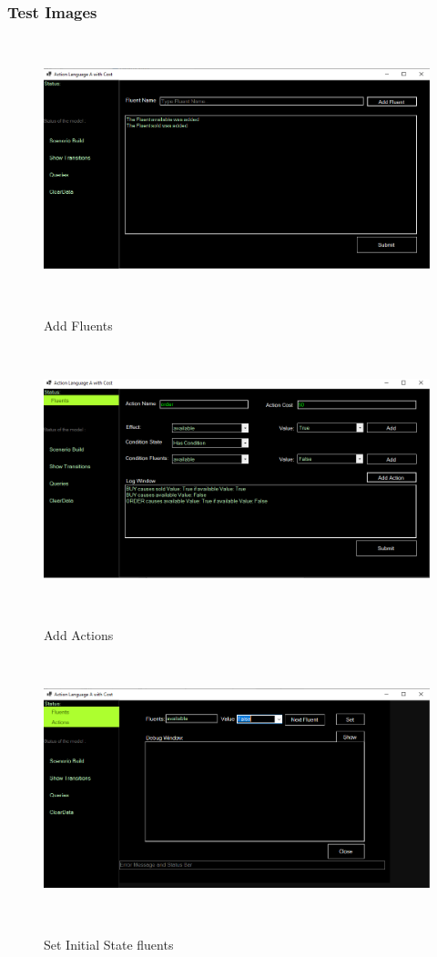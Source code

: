 \documentclass[11pt]{article}
\begin{document}
	\subsubsection*{Test Images}\label{par:502}
	\begin{figure}[H]
		\centering
		\includegraphics[width=6in,height=3in]{./testImages/Example2/img1.png}
		\label{Figure:f02.1}
		\caption{Add Fluents}
	\end{figure}
	\begin{figure}[H]
		\centering
		\includegraphics[width=6in,height=3in]{./testImages/Example2/img2.png}
		\label{Figure:f02.2}
		\caption{Add Actions}
	\end{figure}
	\begin{figure}[H]
		\centering
		\includegraphics[width=6in,height=3in]{./testImages/Example2/img3.png}
		\label{Figure:f02.3}
		\caption{Set Initial State fluents}
	\end{figure}
\end{document}
